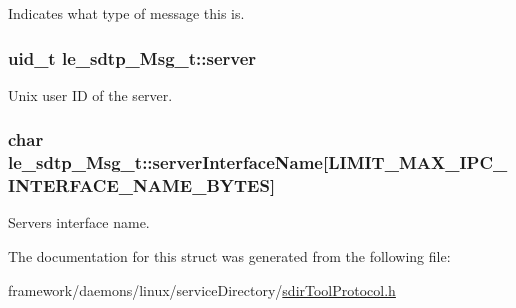 Indicates what type of message this is. 

\subsubsection[{\texorpdfstring{server}{server}}]{\setlength{\rightskip}{0pt plus 5cm}uid\+\_\+t le\+\_\+sdtp\+\_\+\+Msg\+\_\+t\+::server}\hypertarget{structle__sdtp___msg__t_adb2c9a19a46f521cdedb3fd20c0a6f04}{}\label{structle__sdtp___msg__t_adb2c9a19a46f521cdedb3fd20c0a6f04}


Unix user ID of the server. 

\subsubsection[{\texorpdfstring{server\+Interface\+Name}{serverInterfaceName}}]{\setlength{\rightskip}{0pt plus 5cm}char le\+\_\+sdtp\+\_\+\+Msg\+\_\+t\+::server\+Interface\+Name\mbox{[}{\bf L\+I\+M\+I\+T\+\_\+\+M\+A\+X\+\_\+\+I\+P\+C\+\_\+\+I\+N\+T\+E\+R\+F\+A\+C\+E\+\_\+\+N\+A\+M\+E\+\_\+\+B\+Y\+T\+ES}\mbox{]}}\hypertarget{structle__sdtp___msg__t_a483b0dc0d028f7b4a362799a591033ca}{}\label{structle__sdtp___msg__t_a483b0dc0d028f7b4a362799a591033ca}


Server\textquotesingle{}s interface name. 



The documentation for this struct was generated from the following file\+:\begin{DoxyCompactItemize}
\item 
framework/daemons/linux/service\+Directory/\hyperlink{sdir_tool_protocol_8h}{sdir\+Tool\+Protocol.\+h}\end{DoxyCompactItemize}
